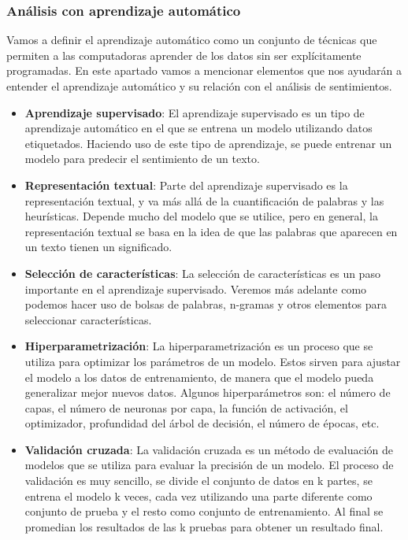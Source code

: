 \documentclass[conference]{IEEEtran}
\begin{document}
\subsubsection{Análisis con aprendizaje automático}
Vamos a definir el aprendizaje automático como un conjunto de técnicas que permiten a las computadoras aprender de los datos sin ser explícitamente programadas. En este apartado vamos a mencionar elementos que nos ayudarán a entender el aprendizaje automático y su relación con el análisis de sentimientos.

\begin{itemize}
\item \textbf{Aprendizaje supervisado}: El aprendizaje supervisado es un tipo de aprendizaje automático en el que se entrena un modelo utilizando datos etiquetados. Haciendo uso de este tipo de aprendizaje, se puede entrenar un modelo para predecir el sentimiento de un texto.
\item \textbf{Representación textual}: Parte del aprendizaje supervisado es la representación textual, y va más allá de la cuantificación de palabras y las heurísticas. Depende mucho del modelo que se utilice, pero en general, la representación textual se basa en la idea de que las palabras que aparecen en un texto tienen un significado.
\item \textbf{Selección de características}: La selección de características es un paso importante en el aprendizaje supervisado. Veremos más adelante como podemos hacer uso de bolsas de palabras, n-gramas y otros elementos para seleccionar características.
\item \textbf{Hiperparametrización}: La hiperparametrización es un proceso que se utiliza para optimizar los parámetros de un modelo. Estos sirven para ajustar el modelo a los datos de entrenamiento, de manera que el modelo pueda generalizar mejor nuevos datos. Algunos hiperparámetros son: el número de capas, el número de neuronas por capa, la función de activación, el optimizador, profundidad del árbol de decisión, el número de épocas, etc.
\item \textbf{Validación cruzada}: La validación cruzada es un método de evaluación de modelos que se utiliza para evaluar la precisión de un modelo. El proceso de validación es muy sencillo, se divide el conjunto de datos en k partes, se entrena el modelo k veces, cada vez utilizando una parte diferente como conjunto de prueba y el resto como conjunto de entrenamiento. Al final se promedian los resultados de las k pruebas para obtener un resultado final.
\end{itemize}
\end{document}
